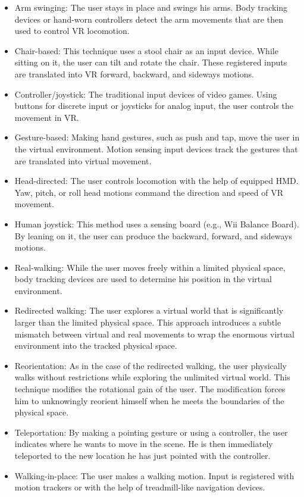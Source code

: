 \begin{itemize}
\item Arm swinging: The user stays in place and swings his arms. Body tracking devices or hand-worn controllers detect the arm movements that are then used to control VR locomotion.
\item Chair-based: This technique uses a stool chair as an input device. While sitting on it, the user can tilt and rotate the chair. These registered inputs are translated into VR forward, backward, and sideways motions.
\item Controller/joystick: The traditional input devices of video games. Using buttons for discrete input or joysticks for analog input, the user controls the movement in VR.
\item Gesture-based: Making hand gestures, such as push and tap, move the user in the virtual environment. Motion sensing input devices track the gestures that are translated into virtual movement.
\item Head-directed: The user controls locomotion with the help of equipped HMD. Yaw, pitch, or roll head motions command the direction and speed of VR movement.
\item Human joystick: This method uses a sensing board (e.g., Wii Balance Board). By leaning on it, the user can produce the backward, forward, and sideways motions.
\item Real-walking: While the user moves freely within a limited physical space, body tracking devices are used to determine his position in the virtual environment.
\item Redirected walking: The user explores a virtual world that is significantly larger than the limited physical space. This approach introduces a subtle mismatch between virtual and real movements to wrap the enormous virtual environment into the tracked physical space.
\item Reorientation: As in the case of the redirected walking, the user physically walks without restrictions while exploring the unlimited virtual world. This technique modifies the rotational gain of the user. The modification forces him to unknowingly reorient himself when he meets the boundaries of the physical space.
\item Teleportation: By making a pointing gesture or using a controller, the user indicates where he wants to move in the scene. He is then immediately teleported to the new location he has just pointed with the controller.
\item Walking-in-place: The user makes a walking motion. Input is registered with motion trackers or with the help of treadmill-like navigation devices.
\end{itemize}

